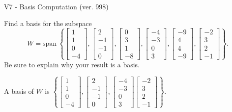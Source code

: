 \begin{exercise}
  \begin{exerciseTitle}V7 - Basis Computation (ver. 998)\end{exerciseTitle}
  \begin{exerciseStatement}
    Find a basis for the subspace 
\[W=\mathrm{span}\ \left\{\left[\begin{array}{r}
1 \\
1 \\
0 \\
-4
\end{array}\right] , \left[\begin{array}{r}
2 \\
-1 \\
-1 \\
0
\end{array}\right] , \left[\begin{array}{r}
0 \\
3 \\
1 \\
-8
\end{array}\right] , \left[\begin{array}{r}
-4 \\
-3 \\
0 \\
3
\end{array}\right] , \left[\begin{array}{r}
-9 \\
4 \\
4 \\
-9
\end{array}\right] , \left[\begin{array}{r}
-2 \\
3 \\
2 \\
-1
\end{array}\right]\right\}.\]
 Be sure to explain why your result is a basis.


  \end{exerciseStatement}
  \begin{exerciseAnswer}
   A basis of \(W\) is  \(\left\{\left[\begin{array}{r}
1 \\
1 \\
0 \\
-4
\end{array}\right] , \left[\begin{array}{r}
2 \\
-1 \\
-1 \\
0
\end{array}\right] , \left[\begin{array}{r}
-4 \\
-3 \\
0 \\
3
\end{array}\right] \left[\begin{array}{r}
-2 \\
3 \\
2 \\
-1
\end{array}\right]\right\}\).
  


  \end{exerciseAnswer}
\end{exercise}